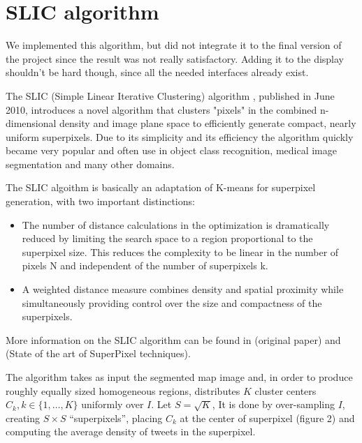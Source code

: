 \section{ SLIC algorithm}
\label{sec:K-M_clustering}

We implemented this algorithm, but did not integrate it to the final version of the project since the result was not really satisfactory. Adding it to the display shouldn't be hard though, since all the needed interfaces already exist. 

The SLIC (Simple Linear Iterative Clustering)  algorithm \cite{SLIC1}, published in June 2010, introduces a novel algorithm that clusters "pixels" in the combined n-dimensional density and image plane space to efficiently generate compact, nearly uniform superpixels. Due to its simplicity and its efficiency the algorithm quickly became very popular and often use in object class recognition, medical image segmentation and many other domains.

The SLIC algoithm is basically an adaptation of K-means for superpixel generation, with two important distinctions:

\begin{itemize}

\item The number of distance calculations in the optimization is dramatically reduced by limiting the search space to a region proportional to the superpixel size. This reduces the complexity to be linear in the number of pixels N and independent of the number of superpixels k.

\item A weighted distance measure combines density and spatial proximity while simultaneously providing control over the size and compactness of the superpixels.

\end{itemize}

More information on the SLIC algorithm can be found in \cite{SLIC1} (original paper) and \cite{SLIC2} (State of the art of SuperPixel techniques).

The algorithm takes as input the segmented map image and, in order to produce roughly equally sized homogeneous regions, distributes $K$ cluster centers $C_k, k \in \{1, \ldots, K \}$ uniformly over $I$. Let $S = \sqrt{K}$, It is done by over-sampling $I$, creating $S \times S$ ``superpixels'', placing $C_k$ at the center of superpixel (figure 2) and computing the average density of tweets in the superpixel. 


